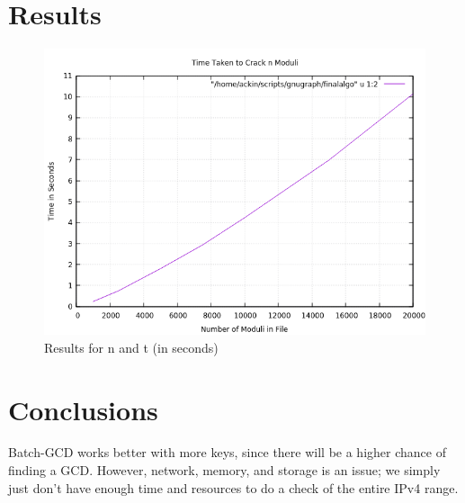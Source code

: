 \documentclass[10pt, letterpaper]{article}
\begin{document}
\section{Results}
\begin{figure}[htp]
  \begin{center}
    \includegraphics{batch-gcd-time.png}
    \caption{Results for n and t (in seconds)}
  \end{center}
\end{figure}

\section{Conclusions}
Batch-GCD works better with more keys, since there will be a higher chance of finding a GCD. However, network, memory, and storage is an issue; we simply just don't have enough time and resources to do a check of the entire IPv4 range.
\end{document}
